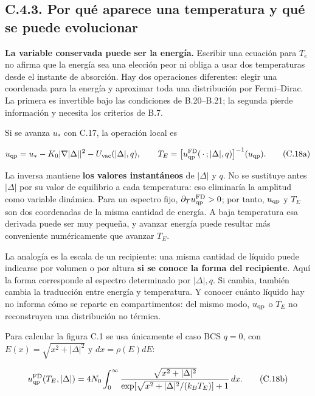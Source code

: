 \documentclass[
  spanish,
  10pt,
  a4paper,
]{article}
\begin{document}
\subsection{C.4.3. Por qué aparece una temperatura y qué se puede
evolucionar}\label{c.4.3.-por-quuxe9-aparece-una-temperatura-y-quuxe9-se-puede-evolucionar}

\textbf{La variable conservada puede ser la energía.} Escribir una
ecuación para \(T_e\) no afirma que la energía sea una elección peor ni
obliga a usar dos temperaturas desde el instante de absorción. Hay dos
operaciones diferentes: elegir una coordenada para la energía y
aproximar toda una distribución por Fermi--Dirac. La primera es
invertible bajo las condiciones de B.20--B.21; la segunda pierde
información y necesita los criterios de B.7.


Si se avanza \(u_*\) con C.17, la operación local es

\[
u_{\rm qp}=u_*-K_0|\nabla|\Delta||^2-U_{\rm vac}(|\Delta|,q),
\qquad
T_E=\big[u_{\rm qp}^{\rm FD}(\,\cdot\,;|\Delta|,q)\big]^{-1}(u_{\rm qp}).
\tag{C.18a}
\]

La inversa mantiene \textbf{los valores instantáneos} de \(|\Delta|\) y
\(q\). No se sustituye antes \(|\Delta|\) por su valor de equilibrio a
cada temperatura: eso eliminaría la amplitud como variable dinámica.
Para un espectro fijo, \(\partial_Tu_{\rm qp}^{\rm FD}>0\); por tanto,
\(u_{\rm qp}\) y \(T_E\) son dos coordenadas de la misma cantidad de
energía. A baja temperatura esa derivada puede ser muy pequeña, y
avanzar energía puede resultar más conveniente numéricamente que avanzar
\(T_E\).

La analogía es la escala de un recipiente: una misma cantidad de líquido
puede indicarse por volumen o por altura \textbf{si se conoce la forma
del recipiente}. Aquí la forma corresponde al espectro determinado por
\(|\Delta|,q\). Si cambia, también cambia la traducción entre energía y
temperatura. Y conocer cuánto líquido hay no informa cómo se reparte en
compartimentos: del mismo modo, \(u_{\rm qp}\) o \(T_E\) no reconstruyen
una distribución no térmica.

Para calcular la figura C.1 se usa únicamente el caso BCS \(q=0\), con
\(E(x)=\sqrt{x^2+|\Delta|^2}\) y \(dx=\rho(E)dE\):

\[
u_{\rm qp}^{\rm FD}(T_E,|\Delta|)=4N_0\int_0^\infty
\frac{\sqrt{x^2+|\Delta|^2}}{\exp[\sqrt{x^2+|\Delta|^2}/(k_BT_E)]+1}\,dx.
\tag{C.18b}
\]
\end{document}
